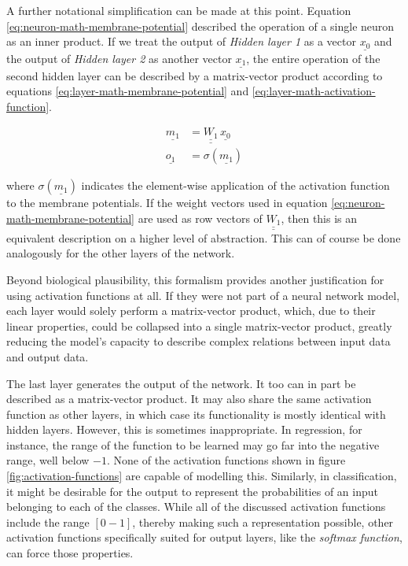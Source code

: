 \documentclass[11pt, a4paper]{article}
\newcommand\braces[1]{\left(#1\right)}
\renewcommand{\vec}[1]{\underline{#1}}
\newcommand{\mat}[1]{\underline{\underline{#1}}}
\begin{document}
A further notational simplification can be made at this point. Equation \eqref{eq:neuron-math-membrane-potential} described the operation of a single neuron as an inner product. If we treat the output of \emph{Hidden layer 1} as a vector $\vec{x_0}$ and the output of \emph{Hidden layer 2} as another vector $\vec{x_1}$, the entire operation of the second hidden layer can be described by a matrix-vector product according to equations \eqref{eq:layer-math-membrane-potential} and \eqref{eq:layer-math-activation-function}.

\begin{align}
	\vec{m_1} &= \mat{W_{1}} \, \vec{x_0} \label{eq:layer-math-membrane-potential} \\
	\vec{o_1} &= \sigma \braces{\vec{m_1}} \label{eq:layer-math-activation-function}
\end{align}

where $\sigma \braces{\vec{m_1}}$ indicates the element-wise application of the activation function to the membrane potentials. If the weight vectors used in equation \eqref{eq:neuron-math-membrane-potential} are used as row vectors of $\mat{W_1}$, then this is an equivalent description on a higher level of abstraction. This can of course be done analogously for the other layers of the network.

Beyond biological plausibility, this formalism provides another justification for using activation functions at all. If they were not part of a neural network model, each layer would solely perform a matrix-vector product, which, due to their linear properties, could be collapsed into a single matrix-vector product, greatly reducing the model's capacity to describe complex relations between input data and output data.

The last layer generates the output of the network. It too can in part be described as a matrix-vector product. It may also share the same activation function as other layers, in which case its functionality is mostly identical with hidden layers. However, this is sometimes inappropriate. In regression, for instance, the range of the function to be learned may go far into the negative range, well below $-1$. None of the activation functions shown in figure \ref{fig:activation-functions} are capable of modelling this. Similarly, in classification, it might be desirable for the output to represent the probabilities of an input belonging to each of the classes. While all of the discussed activation functions include the range $[0-1]$, thereby making such a representation possible, other activation functions specifically suited for output layers, like the \emph{softmax function}, can force those properties.
\end{document}
